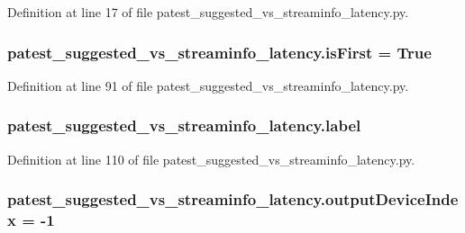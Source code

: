 Definition at line 17 of file patest\+\_\+suggested\+\_\+vs\+\_\+streaminfo\+\_\+latency.\+py.

\subsubsection[{\texorpdfstring{is\+First}{isFirst}}]{ patest\+\_\+suggested\+\_\+vs\+\_\+streaminfo\+\_\+latency.\+is\+First = True}\hypertarget{namespacepatest__suggested__vs__streaminfo__latency_a8480c4acf54c3c5a9d64b0cea184042a}{}\label{namespacepatest__suggested__vs__streaminfo__latency_a8480c4acf54c3c5a9d64b0cea184042a}


Definition at line 91 of file patest\+\_\+suggested\+\_\+vs\+\_\+streaminfo\+\_\+latency.\+py.

\subsubsection[{\texorpdfstring{label}{label}}]{\setlength{\rightskip}{0pt plus 5cm}patest\+\_\+suggested\+\_\+vs\+\_\+streaminfo\+\_\+latency.\+label}\hypertarget{namespacepatest__suggested__vs__streaminfo__latency_aa0799fc0095e14a8957620a769574888}{}\label{namespacepatest__suggested__vs__streaminfo__latency_aa0799fc0095e14a8957620a769574888}


Definition at line 110 of file patest\+\_\+suggested\+\_\+vs\+\_\+streaminfo\+\_\+latency.\+py.

\subsubsection[{\texorpdfstring{output\+Device\+Index}{outputDeviceIndex}}]{ patest\+\_\+suggested\+\_\+vs\+\_\+streaminfo\+\_\+latency.\+output\+Device\+Index = -\/1}\hypertarget{namespacepatest__suggested__vs__streaminfo__latency_a2c1f99e6ac4c129fa6a4847bcff6f80e}{}\label{namespacepatest__suggested__vs__streaminfo__latency_a2c1f99e6ac4c129fa6a4847bcff6f80e}


